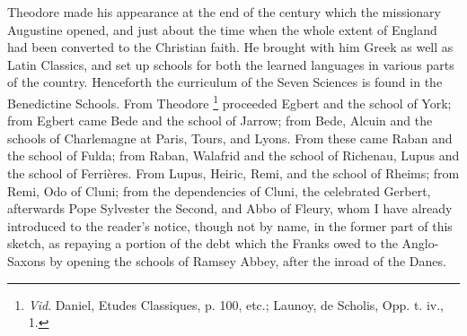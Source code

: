 Theodore made his appearance at the end of the century which the
missionary Augustine opened, and just about the time when the whole
extent of England had been converted to the Christian faith. He
brought with him Greek as well as Latin Classics, and set up schools
for both the learned languages in various parts of the country.
Henceforth the curriculum of the Seven Sciences is found in the
Benedictine Schools. From Theodore \footnote{\emph{Vid}.
Daniel, Etudes Classiques, p. 100, etc.; Launoy, de Scholis, Opp. t.
iv., 1.} proceeded Egbert and the school of York; from Egbert came Bede
and the school of Jarrow; from Bede, Alcuin and the schools of
Charlemagne at Paris, Tours, and Lyons. From these came Raban and the
school of Fulda; from Raban, Walafrid and the school of Richenau,
Lupus and the school of Ferrières. From Lupus, Heiric, Remi, and the
school of Rheims; from Remi, Odo of Cluni; from the dependencies of
Cluni, the celebrated Gerbert, afterwards Pope Sylvester the Second,
and Abbo of Fleury, whom I have already introduced to the reader's
notice, though not by name, in the former part of this sketch, as
repaying a portion of the debt which the Franks owed to the
Anglo-Saxons by opening the schools of Ramsey Abbey, after the inroad
of the Danes.

